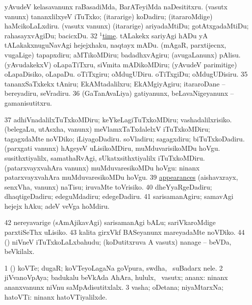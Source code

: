  yAvudeV kelasavanunx raBasadiMda, BarATeyiMda naDesititxru. 
\eanum
\numie
{}  
\banum
{} (vasutx \mo vanunx) tananxlilxyeV iTuTxko; (itararige) koDadiru; (itararoMdige) haMcikoLaLxdiru. 
 (vasutx \mo vanunx) (itararige) ariyadaMtiDu; gotAtxgadaMtiDu; rahasayxvAgiDu; bacicxDu. 
\eanum
\numie
\num{32}  \hyperref{kandict_t.pdf}{T}{time(1) pagu(29)}{$^1$time}. tALakekx sariyAgi hADu yA tALakakxnuguNavAgi hejejxhaku, naqtayx mADu. 
  
\banum
{} (mAgaR, parxtijecnx, \mo vugaLige) tapapxdiru; aMTikoMDiru; badadhxvAgiru; (avugaLanunx) pAlisu. 
 (yAvudakekxV) oLapaTiTxru, siVmita mADikoMDiru; (yAvudeV parimitige) oLapaDisiko, oLapaDu. 
\eanum
\numie
{}  
\banum
{} oTiTxgiru; oMdugUDiru. 
 oTiTxgiDu; oMdugUDisiru. 
\eanum
\numie
\num{35}  tananxSaTxkekx tAniru; EkAMtadalilxru; EkAMgiyAgiru; itararoDane -- bereyadiru, seVradiru. 
\num{36}  (GaTanAvaLiya) gatiyanunx, beLavaNigeyanunx -- gamanisutitxru. 
\num{37}  adhiVnadalilxTuTxkoMDiru; keYkeLagiTuTxkoMDiru; vashadalilxrisiko. 
  
\banum
{} (belegaLu, utAsxha, \mo vanunx) meVlamxTaTxdalelxV iTuTxkoMDiru; tagagxdaMte noVDiko; iLiyagoDadiru. 
 soVladiru; sagagxdiru; biTuTxkoDadiru. 
 (parxgati \mo vanunx) hAgeyeV uLisikoMDiru, muMduvarisikoMDu hoVgu. 
 susithxtiyalilx, samathaRvAgi, sUkatxsithxtiyalilx iTuTxkoMDiru. 
 (patarxvayxvahAra \mo vanunx) muMduvaresikoMDu hoVgu:  ninanx patarxvayxvahAra muMduvaresikoMDu hoVgu. 
\eanum
\numie
\num{39}  \hyperref{kandict_a.pdf}{A}{appearance nuga(1)}{appearances} (aishavxrayx, senxVha, \mo vanunx) naTisu; iruvaMte toVrisiko. 
\num{40}  dheYyaRgeDadiru; dhaqtigeDadiru; edeguMdadiru; edegeDadiru. 
\num{41}  sarisamanAgiru; samavAgi hejejx hAku; adeV veVga hoMdiru. 
\num{42}  nereyavarige (sAmAjikavAgi) sarisamanAgi bALu; sariVkaroMdige parxtiSeThx uLisiko. 
\num{43}  kalita girxVkf BASeyanunx mareyadaMte noVDiko. 
\num{44}  (\AmA) niVneV iTuTxkoLaLxbahudu; (koDutitxruva A vasutx) nanage -- beVDa, beVkilalx. 
\enum
\emng
\eentry

\bentry
{}
\gl{\nA}
\bmng
\bnum
\num{1} (\ca) koVTe; dugaR; koVTeyoLagaNa goVpura, swdha, \mo\ suBadarx nele. 
\num{2} jiVvanoVpAya; badukalu beVkAda AhAra, hululx, \mo\ vasutx; ananx:  ninanx ananxvanunx niVnu saMpAdisutitxlalx. 
\num{3} vasha; oDetana; niyaMtarxNa; hatoVTi:  ninanx hatoVTiyalilxde. 
\enum
\emng

